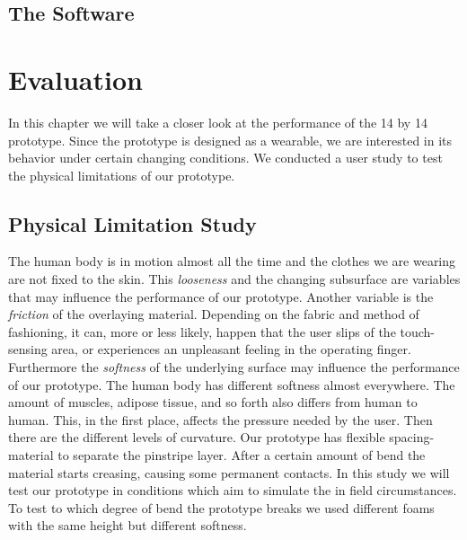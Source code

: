 \section{The Software}

\chapter{Evaluation}
In this chapter we will take a closer look at the performance of the 14 by 14 prototype. Since the prototype is designed as a wearable, we are interested in its behavior under certain changing conditions. We conducted a user study to test the physical limitations of our prototype. 

\section{Physical Limitation Study}
The human body is in motion almost all the time and the clothes we are wearing are not fixed to the skin. This \emph{looseness} and the changing subsurface are variables that may influence the performance of our prototype. Another variable is the \emph{friction} of the overlaying material. Depending on the fabric and method of fashioning, it can, more or less likely, happen that the user slips of the touch-sensing area, or experiences an unpleasant feeling in the operating finger. Furthermore the \emph{softness} of the underlying surface may influence the performance of our prototype. The human body has different softness almost everywhere. The amount of muscles, adipose tissue, and so forth also differs from human to human. This, in the first place, affects the pressure needed by the user. Then there are the different levels of curvature. Our prototype has flexible spacing-material to separate the pinstripe layer. After a certain amount of bend the material starts creasing, causing some permanent contacts. In this study we will test our prototype in conditions which aim to simulate the in field circumstances. To test to which degree of bend the prototype breaks we used different foams with the same height but different softness.

